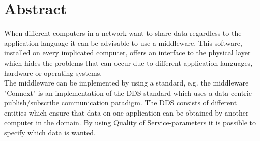 \documentclass[Main]{subfiles}
\begin{document}
\chapter*{Abstract}

When different computers in a network want to share data regardless to the application-language it can be advisable to use a middleware. This software, installed on every implicated computer, offers an interface to the physical layer which hides the problems that can occur due to different application languages, hardware or operating systems.\\The middleware can be implemented by using a standard, e.g. the middleware "Connext" is an implementation of the DDS standard which uses a data-centric publish/subscribe communication paradigm. The DDS consists of different entities which ensure that data on one application can be obtained by another computer in the domain. By using Quality of Service-parameters it is possible to specify which data is wanted.


\setcounter{tocdepth}{1}
\tableofcontents
\end{document}
